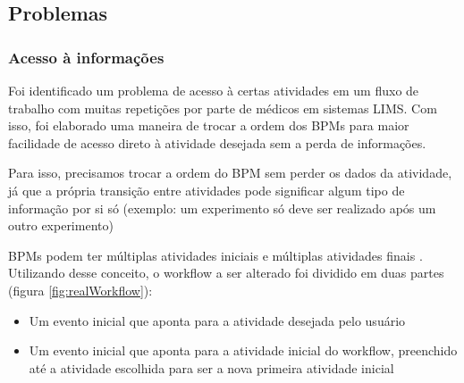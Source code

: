 \subsection{Problemas}

\subsubsection{Acesso à informações}

Foi identificado um problema de acesso à certas atividades em um fluxo de trabalho com muitas repetições por parte de médicos em sistemas LIMS. Com isso, foi elaborado uma maneira de trocar a ordem dos BPMs para maior facilidade de acesso direto à atividade desejada sem a perda de informações.

Para isso, precisamos trocar a ordem do BPM sem perder os dados da atividade, já que a própria transição entre atividades pode significar algum tipo de informação por si só (exemplo: um experimento só deve ser realizado após um outro experimento)

BPMs podem ter múltiplas atividades iniciais e múltiplas atividades finais \cite{Dijkman2008}. Utilizando desse conceito, o workflow a ser alterado foi dividido em duas partes (figura \ref{fig:realWorkflow}): 

\begin{itemize}
    \item Um evento inicial que aponta para a atividade desejada pelo usuário
    \item Um evento inicial que aponta para a atividade inicial do workflow, preenchido até a atividade escolhida para ser a nova primeira atividade inicial
\end{itemize}

